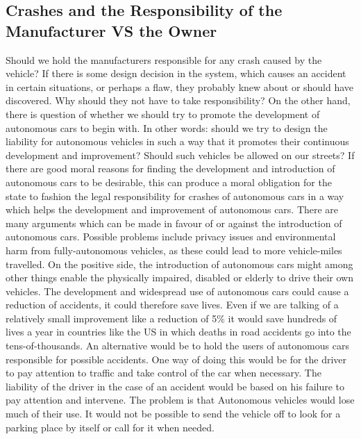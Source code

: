 \documentclass{article}
\begin{document}
\subsection{Crashes and the Responsibility of the Manufacturer VS the Owner}

Should we hold the manufacturers responsible for any crash caused by the vehicle? If there is some design decision in the system, which causes an accident in certain situations, or perhaps a flaw, they probably knew about or should have discovered. Why should they not have to take responsibility?
\bigbreak
On the other hand, there is question of whether we should try to promote the development of autonomous cars to begin with. In other words: should we try to design the liability for autonomous vehicles in such a way that it promotes their continuous development and improvement? Should such vehicles be allowed on our streets? If there are good moral reasons for finding the development and introduction of autonomous cars to be desirable, this can produce a moral obligation for the state to fashion the legal responsibility for crashes of autonomous cars in a way which helps the development and improvement of autonomous cars.
\bigbreak
There are many arguments which can be made in favour of or against the introduction of autonomous cars. Possible problems include privacy issues and environmental harm from fully-autonomous vehicles, as these could lead to more vehicle-miles travelled. On the positive side, the introduction of autonomous cars might among other things enable the physically impaired, disabled or elderly to drive their own vehicles.
\bigbreak
The development and widespread use of autonomous cars could cause a reduction of accidents, it could therefore save lives. Even if we are talking of a relatively small improvement like a reduction of 5\% it would save hundreds of lives a year in countries like the US in which deaths in road accidents go into the tens-of-thousands. 
\bigbreak
An alternative would be to hold the users of autonomous cars responsible for possible accidents. One way of doing this would be for the driver to pay attention to traffic and take control of the car when necessary. The liability of the driver in the case of an accident would be based on his failure to pay attention and intervene. The problem is that Autonomous vehicles would lose much of their use. It would not be possible to send the vehicle off to look for a parking place by itself or call for it when needed. 
\bigbreak
\end{document}
